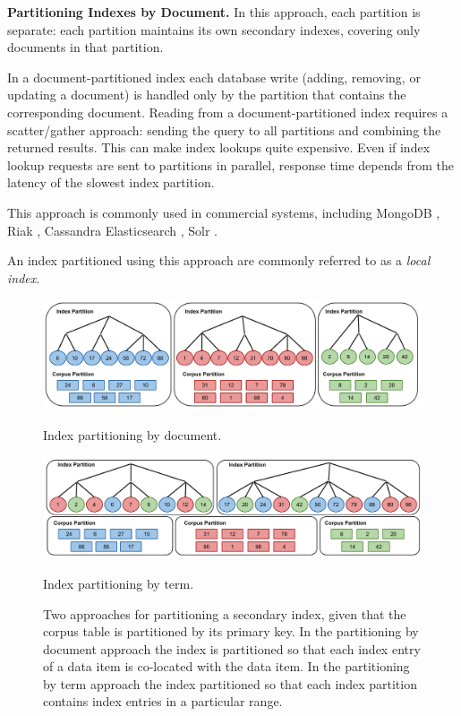 \bigskip
\noindent
\textbf{Partitioning Indexes by Document.}
In this approach, each partition is separate:
each partition maintains its own secondary indexes, covering only documents in that partition.

In a document-partitioned index
each database write (adding, removing, or updating a document) is handled only by the partition that contains the
corresponding document.
Reading from a document-partitioned index requires a scatter/gather approach:
sending the query to all partitions and combining the returned results.
This can make index lookups quite expensive.
Even if index lookup requests are sent to partitions in parallel, response time depends from the latency of the slowest
index partition.

This approach is commonly used in commercial systems, including
MongoDB \cite{coubase:mongoindexes}, Riak \cite{riakv:secondaryindexes}, Cassandra \cite{cassandra:secondaryindexing}
Elasticsearch \cite{elastic:docrouting}, Solr \cite{solr:indexsharding}.

An index partitioned using this approach are commonly referred to as a \textit{local index}.

\begin{figure}
    \centering
    \begin{minipage}{.48\textwidth}
        \centering
        \includegraphics[width=\textwidth]{./figures/background/index_partitioning_by_doc.pdf}
        \caption{Index partitioning by document.}
        \label{fig:index_partitioning_by_doc}
    \end{minipage}%
    \begin{minipage}{.5\textwidth}
        \centering
        \includegraphics[width=\textwidth]{./figures/background/index_partitioning_by_term.pdf}
        \caption{Index partitioning by term.}
        \label{fig:index_partitioning_by_term}
    \end{minipage}
    \caption{Two approaches for partitioning a secondary index, given that the corpus table is partitioned by its primary key.
      In the partitioning by document approach the index is partitioned so that each index entry of a data item is co-located with the data item.
      In the partitioning by term approach the index partitioned so that each index partition contains index entries in a particular range.}
\end{figure}

